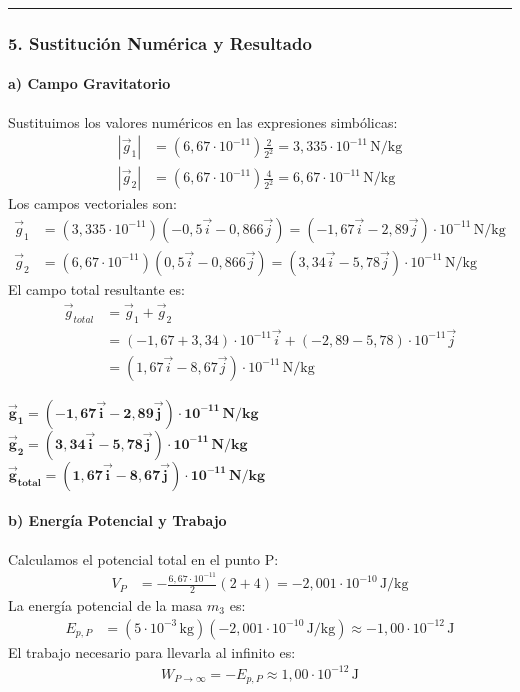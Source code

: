 \hrule
\vspace{1em}


\subsubsection*{5. Sustitución Numérica y Resultado}

\paragraph{a) Campo Gravitatorio}
Sustituimos los valores numéricos en las expresiones simbólicas:
\begin{align*}
    |\vec{g}_1| &= (6,67\cdot10^{-11}) \frac{2}{2^2} = 3,335\cdot10^{-11}\,\text{N/kg} \\
    |\vec{g}_2| &= (6,67\cdot10^{-11}) \frac{4}{2^2} = 6,67\cdot10^{-11}\,\text{N/kg}
\end{align*}
Los campos vectoriales son:
\begin{align*}
    \vec{g}_1 &= (3,335\cdot10^{-11})(-0,5\vec{i} - 0,866\vec{j}) = (-1,67\vec{i} - 2,89\vec{j})\cdot10^{-11}\,\text{N/kg} \\
    \vec{g}_2 &= (6,67\cdot10^{-11})(0,5\vec{i} - 0,866\vec{j}) = (3,34\vec{i} - 5,78\vec{j})\cdot10^{-11}\,\text{N/kg}
\end{align*}
El campo total resultante es:
\begin{align*}
    \vec{g}_{total} &= \vec{g}_1 + \vec{g}_2 \\
    &= (-1,67+3,34)\cdot10^{-11}\vec{i} + (-2,89-5,78)\cdot10^{-11}\vec{j} \\
    &= (1,67\vec{i} - 8,67\vec{j})\cdot10^{-11}\,\text{N/kg}
\end{align*}

\begin{cajaresultado}
    $\boldsymbol{\vec{g}_1 = (-1,67\vec{i} - 2,89\vec{j})\cdot10^{-11}\,\textbf{N/kg}}$ \\
    $\boldsymbol{\vec{g}_2 = (3,34\vec{i} - 5,78\vec{j})\cdot10^{-11}\,\textbf{N/kg}}$ \\
    $\boldsymbol{\vec{g}_{total} = (1,67\vec{i} - 8,67\vec{j})\cdot10^{-11}\,\textbf{N/kg}}$
\end{cajaresultado}

\paragraph{b) Energía Potencial y Trabajo}
Calculamos el potencial total en el punto P:
\begin{align*}
    V_P &= -\frac{6,67\cdot10^{-11}}{2}(2+4) = -2,001\cdot10^{-10}\,\text{J/kg}
\end{align*}
La energía potencial de la masa $m_3$ es:
\begin{align*}
    E_{p,P} &= (5\cdot10^{-3}\,\text{kg})(-2,001\cdot10^{-10}\,\text{J/kg}) \approx -1,00\cdot10^{-12}\,\text{J}
\end{align*}
El trabajo necesario para llevarla al infinito es:
\begin{align*}
    W_{P \to \infty} = -E_{p,P} \approx 1,00\cdot10^{-12}\,\text{J}
\end{align*}

